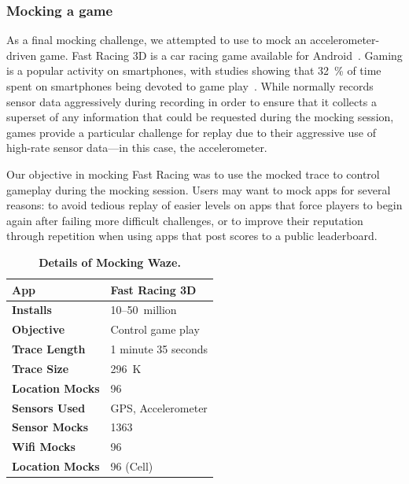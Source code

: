 \subsubsection{Mocking a game}

As a final mocking challenge, we attempted to use \PocketMocker{} to mock an
accelerometer-driven game. Fast Racing 3D is a car racing game available for
Android~\cite{fastracing-playstore-url}. Gaming is a popular activity on
smartphones, with studies showing that 32~\% of time spent on smartphones
being devoted to game play~\cite{flurry-smartphoneuse}. While \PocketMocker{}
normally records sensor data aggressively during recording in order to ensure
that it collects a superset of any information that could be requested during
the mocking session, games provide a particular challenge for replay due to
their aggressive use of high-rate sensor data---in this case, the
accelerometer.

Our objective in mocking Fast Racing was to use the mocked trace to control
gameplay during the mocking session. Users may want to mock apps for several
reasons: to avoid tedious replay of easier levels on apps that force players
to begin again after failing more difficult challenges, or to improve their
reputation through repetition when using apps that post scores to a public
leaderboard.

\begin{table}
{\small
\begin{tabularx}{0.6\textwidth}{lX}
\textbf{App} & Fast Racing 3D \\ \toprule
\textbf{Installs} & 10--50~million \\
\textbf{Objective} & Control game play \\ \midrule
\textbf{Trace Length} & 1 minute 35 seconds \\
\textbf{Trace Size} & 296~K \\
\textbf{Location Mocks} & 96 \\
\textbf{Sensors Used} & {\small GPS, Accelerometer} \\
\textbf{Sensor Mocks} & 1363 \\
\textbf{Wifi Mocks} & 96 \\
\textbf{Location Mocks} & 96 (Cell) \\
\end{tabularx}

\caption{\textbf{Details of Mocking Waze.}}

\label{table-mocking-waze}
}
\vspace*{-0.1in}
\end{table}

